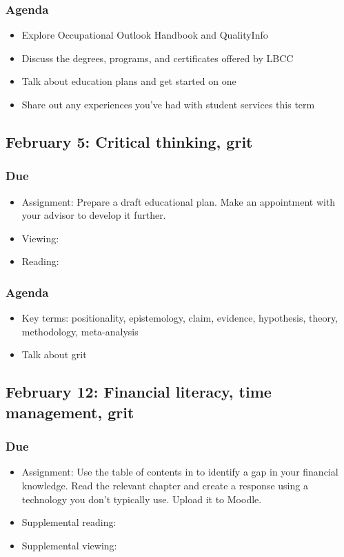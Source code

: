 \documentclass[12pt,article,oneside]{memoir}
\begin{document}
\subsubsection{Agenda}
\begin{itemize}
 \item Explore Occupational Outlook Handbook and QualityInfo
 \item Discuss the degrees, programs, and certificates offered by LBCC
\item Talk about education plans and get started on one
 \item Share out any experiences you've had with student services this term
\end{itemize}


\subsection{February 5: Critical thinking, grit}
\subsubsection{Due}
\begin{itemize}
 \item Assignment: Prepare a draft educational plan.  Make an appointment with your advisor to develop it further.
 \item Viewing: \cite{duckworth}
 \item Reading: \cite{sultan}
\end{itemize}


\subsubsection{Agenda}
\begin{itemize}
\item Key terms: positionality, epistemology, claim, evidence, hypothesis, theory, methodology, meta-analysis
\item Talk about grit
\end{itemize}




\subsection{February 12: Financial literacy, time management, grit}
\subsubsection{Due}
\begin{itemize}
 \item Assignment: Use the table of contents in \cite{everyday} to identify a gap in your financial knowledge.  Read the relevant chapter and create a response using a technology you don't typically use.  Upload it to Moodle.
 \item Supplemental reading: \cite{finra, smart}
 \item Supplemental viewing: \cite{credits}
\end{itemize}
\end{document}
